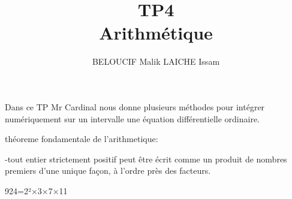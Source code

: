 \documentclass{article}
\title{TP4\\ Arithmétique}
\author{BELOUCIF Malik LAICHE Issam}
\begin{document}
\maketitle

Dans ce TP Mr Cardinal nous donne plusieurs méthodes pour intégrer numériquement sur un intervalle une équation différentielle ordinaire.


théoreme fondamentale de l'arithmetique:

-tout entier strictement positif peut être écrit comme un produit de nombres premiers d'une unique façon, à l'ordre près des facteurs.

924=2²×3×7×11
\end{document}
